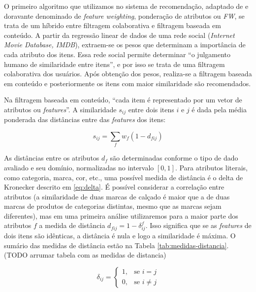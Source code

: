 
O primeiro algoritmo que utilizamos no sistema de recomendação, adaptado de  \cite{symeonidis2007feature} e doravante denominado de \textit{feature weighting}, ponderação de atributos ou \textit{FW}, se trata de um híbrido entre filtragem colaborativa e filtragem baseada em conteúdo. A partir da regressão linear de dados de uma rede social (\textit{Internet Movie Database, IMDB}), extraem-se os pesos que determinam a importância de cada atributo dos itens. Essa rede social permite determinar ``o julgamento humano de similaridade entre itens'', e por isso se trata de uma filtragem colaborativa dos usuários. Após obtenção dos pesos, realiza-se a filtragem baseada em conteúdo e posteriormente os itens com maior similaridade são recomendados.

Na filtragem baseada em conteúdo, ``cada item é representado por um vetor de atributos ou \textit{features}''. A similaridade $s_{ij}$ entre dois itens $i$ e $j$ é dada pela média ponderada das distâncias entre das \textit{features} dos itens:

\begin{equation} 
\label{eq:similaridade}
    s_{ij} = \sum_{f}{w_{f} \left(1-d_{fij}\right)}
\end{equation}

As distâncias entre os atributos $d_f$ são determinadas conforme o tipo de dado avaliado e seu domínio, normalizadas no intervalo $\left[0,1\right]$. Para atributos literais, como categoria, marca, cor, etc., uma possível medida de distância é o delta de Kronecker descrito em \ref{eq:delta}. É possível considerar a correlação entre atributos (a similaridade de duas marcas de calçado é maior que a de duas marcas de produtos de categorias distintas, mesmo que as marcas sejam diferentes), mas em uma primeira análise utilizaremos para a maior parte dos atributos $f$ a medida de distância $d_{fij}=1-\delta_{ij}^f$. Isso significa que se as \textit{features} de dois itens são idênticas, a distância é nula e logo a similaridade é máxima. O sumário das medidas de distância estão na Tabela \ref{tab:medidas-distancia}. (TODO arrumar tabela com as medidas de distancia)

\begin{equation}
\label{eq:delta}
\delta_{ij} = 
\begin{cases}
1, &\text{se }i=j \\
0, &\text{se }i \neq j
\end{cases} 
\end{equation}

